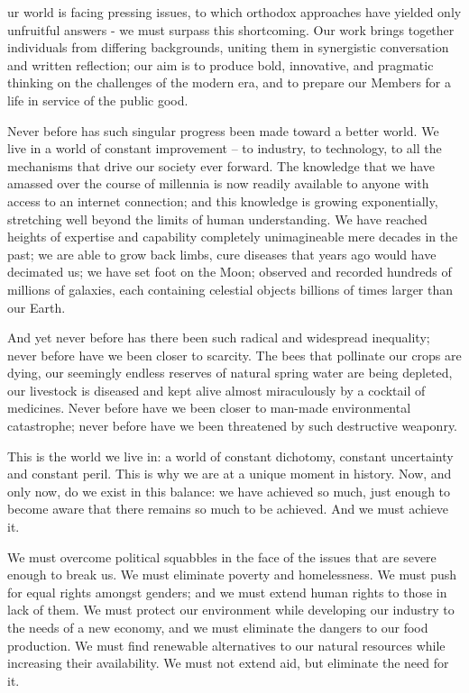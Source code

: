 
   ur world is facing pressing issues, to which orthodox approaches have
   yielded only unfruitful answers - we must surpass this shortcoming. Our
   work brings together individuals from differing backgrounds, uniting
   them in synergistic conversation and written reflection; our aim is to
   produce bold, innovative, and pragmatic thinking on the challenges of
   the modern era, and to prepare our Members for a life in service of the
   public good.

   Never before has such singular progress been made toward a better
   world. We live in a world of constant improvement -- to industry, to
   technology, to all the mechanisms that drive our society ever forward.
   The knowledge that we have amassed over the course of millennia is now
   readily available to anyone with access to an internet connection; and
   this knowledge is growing exponentially, stretching well beyond the
   limits of human understanding. We have reached heights of expertise and
   capability completely unimagineable mere decades in the past; we are
   able to grow back limbs, cure diseases that years ago would have
   decimated us; we have set foot on the Moon; observed and recorded
   hundreds of millions of galaxies, each containing celestial objects
   billions of times larger than our Earth.

   And yet never before has there been such radical and widespread
   inequality; never before have we been closer to scarcity. The bees that
   pollinate our crops are dying, our seemingly endless reserves of
   natural spring water are being depleted, our livestock is diseased and
   kept alive almost miraculously by a cocktail of medicines. Never before
   have we been closer to man-made environmental catastrophe; never before
   have we been threatened by such destructive weaponry.

   This is the world we live in: a world of constant dichotomy, constant
   uncertainty and constant peril. This is why we are at a unique moment
   in history. Now, and only now, do we exist in this balance: we have
   achieved so much, just enough to become aware that there remains so
   much to be achieved. And we must achieve it.

   We must overcome political squabbles in the face of the issues that are
   severe enough to break us. We must eliminate poverty and homelessness.
   We must push for equal rights amongst genders; and we must extend human
   rights to those in lack of them. We must protect our environment while
   developing our industry to the needs of a new economy, and we must
   eliminate the dangers to our food production. We must find renewable
   alternatives to our natural resources while increasing their
   availability. We must not extend aid, but eliminate the need for it.

